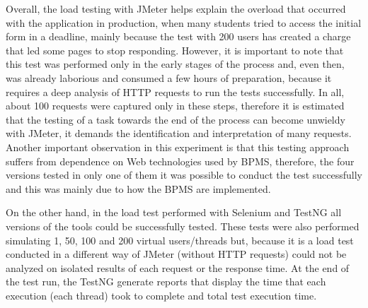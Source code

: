 \documentclass[runningheads,a4paper]{llncs}
\begin{document}

Overall, the load testing with JMeter helps explain the overload that occurred with the application in production, when many students tried to access the initial form in a deadline, mainly because the test with 200 users has created a charge that led some pages to stop responding. However, it is important to note that this test was performed only in the early stages of the process and, even then, was already laborious and consumed a few hours of preparation, because it requires a deep analysis of HTTP requests to run the tests successfully. In all, about 100 requests were captured only in these steps, therefore it is estimated that the testing of a task towards the end of the process can become unwieldy with JMeter, it demands the identification and interpretation of many requests. Another important observation in this experiment is that this testing approach suffers from dependence on Web technologies used by BPMS, therefore, the four versions tested in only one of them it was possible to conduct the test successfully and this was mainly due to how the BPMS are implemented.

On the other hand, in the load test performed with Selenium and TestNG all versions of the tools could be successfully tested. These tests were also performed simulating 1, 50, 100 and 200 virtual users/threads but, because it is a load test conducted in a different way of JMeter (without HTTP requests) could not be analyzed on isolated results of each request or the response time. At the end of the test run, the TestNG generate reports that display the time that each execution (each thread) took to complete and total test execution time. 
\end{document}

